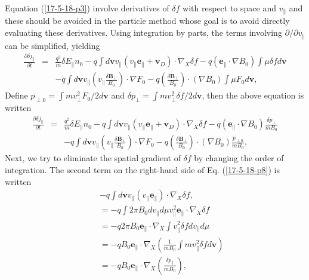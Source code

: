 \documentclass{llncs}
\begin{document}
Equation (\ref{17-5-18-p3}) involve derivatives of $\delta f$ with respect to
space and $v_{\parallel}$ and these should be avoided in the particle method
whose goal is to avoid directly evaluating these derivatives. Using
integration by parts, the terms involving $\partial / \partial v_{\parallel}$
can be simplified, yielding
\begin{eqnarray}
  \frac{\partial \delta j_{\parallel}}{\partial t} & = & \frac{q^2}{m} \delta
  E_{\parallel} n_0 - q \int d\mathbf{v}v_{\parallel} (v_{\parallel}
  \mathbf{e}_{\parallel} +\mathbf{v}_D) \cdot \nabla_X \delta f - q
  (\mathbf{e}_{\parallel} \cdot \nabla B_0) \int \mu \delta f d\mathbf{v}
  \nonumber\\
  &  & - q \int d\mathbf{v}v_{\parallel} \left( v_{\parallel} \frac{\delta
  \mathbf{B}_{\perp}}{B_0} \right) \cdot \nabla F_0 - q \left( \frac{\delta
  \mathbf{B}_{\perp}}{B_0} \right) \cdot (\nabla B_0) \int \mu F_0
  d\mathbf{v}, 
\end{eqnarray}
Define $p_{\perp 0} = \int m v_{\perp}^2 F_0 / 2 d\mathbf{v}$ and $\delta
p_{\perp} = \int m v_{\perp}^2 \delta f / 2 d\mathbf{v}$, then the above
equation is written
\begin{eqnarray}
  \frac{\partial \delta j_{\parallel}}{\partial t} & = & \frac{q^2}{m} \delta
  E_{\parallel} n_0 - q \int d\mathbf{v}v_{\parallel} (v_{\parallel}
  \mathbf{e}_{\parallel} +\mathbf{v}_D) \cdot \nabla_X \delta f - q
  (\mathbf{e}_{\parallel} \cdot \nabla B_0) \frac{\delta p_{\perp}}{m B_0}
  \nonumber\\
  &  & - q \int d\mathbf{v}v_{\parallel} \left( v_{\parallel} \frac{\delta
  \mathbf{B}_{\perp}}{B_0} \right) \cdot \nabla F_0 - q \left( \frac{\delta
  \mathbf{B}_{\perp}}{B_0} \right) \cdot (\nabla B_0) \frac{p_{\perp 0}}{m
  B_0},  \label{17-5-18-p8}
\end{eqnarray}
Next, we try to eliminate the spatial gradient of $\delta f$ by changing the
order of integration. The second term on the right-hand side of Eq.
(\ref{17-5-18-p8}) is written
\begin{eqnarray}
  &  & - q \int d\mathbf{v}v_{\parallel} (v_{\parallel}
  \mathbf{e}_{\parallel}) \cdot \nabla_X \delta f, \nonumber\\
  &  & = - q \int 2 \pi B_0 d v_{\parallel} d \mu v_{\parallel}^2
  \mathbf{e}_{\parallel} \cdot \nabla_X \delta f \nonumber\\
  &  & = - q 2 \pi B_0 \mathbf{e}_{\parallel} \cdot \nabla_X \int
  v_{\parallel}^2 \delta f d v_{\parallel} d \mu \nonumber\\
  &  & = - q B_0 \mathbf{e}_{\parallel} \cdot \nabla_X \left( \frac{1}{m B_0}
  \int m v_{\parallel}^2 \delta f d\mathbf{v} \right) \nonumber\\
  &  & = - q B_0 \mathbf{e}_{\parallel} \cdot \nabla_X \left( \frac{\delta
  p_{\parallel}}{m B_0} \right), 
\end{eqnarray}
\end{document}
